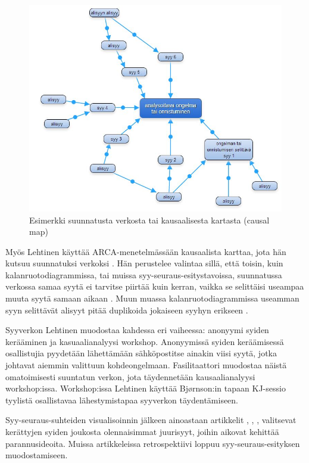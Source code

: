 \begin{figure}[ht!]
\centering
\includegraphics[width=150mm]{suunnattu_verkko_esimerkki_relaatioilla.jpg}
\caption{Esimerkki suunnatusta verkosta tai kausaalisesta kartasta (causal map)}
\label{verkko_ex}
\end{figure}

Myös Lehtinen käyttää ARCA-menetelmässään kausaalista karttaa, jota hän kutsuu suunnatuksi verkoksi \citep{Lehtinen2011}. Hän perustelee valintaa sillä, että toisin, kuin kalanruotodiagrammissa, tai muissa syy-seuraus-esitystavoissa, suunnatussa verkossa samaa syytä ei tarvitse piirtää kuin kerran, vaikka se selittäisi useampaa muuta syytä samaan aikaan \citep{Lehtinen2011}. Muun muassa kalanruotodiagrammissa useamman syyn selittävät alisyyt pitää duplikoida jokaiseen syyhyn erikseen \citep{Lehtinen2011}. 

Syyverkon Lehtinen muodostaa kahdessa eri vaiheessa: anonyymi syiden kerääminen ja kasuaalianalyysi workshop. Anonyymissä syiden keräämisessä osallistujia pyydetään lähettämään sähköpostitse ainakin viisi syytä, jotka johtavat aiemmin valittuun kohdeongelmaan. Fasilitaattori muodostaa näistä omatoimisesti suuntatun verkon, jota täydennetään kausaalianalyysi workshop:issa. Workshop:issa Lehtinen käyttää Bj{\o}rnson:in tapaan KJ-sessio tyylistä osallistavaa lähestymistapaa syyverkon täydentämiseen. \citep{Lehtinen2011}

Syy-seuraus-suhteiden visualisoinnin jälkeen ainoastaan artikkelit \citep{card1998learning}, \citep{staalhane2004root}, \citep{karlsson2006case}, \citep{Lehtinen2011} valitsevat kerättyjen syiden joukosta olennaisimmat juurisyyt, joihin aikovat kehittää parannusideoita. Muissa artikkeleissa retrospektiivi loppuu syy-seuraus-esityksen muodostamiseen.

